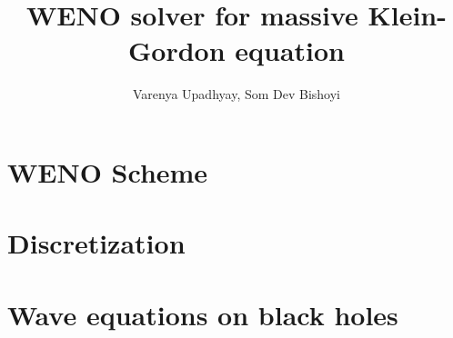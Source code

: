 \documentclass{article}[14pt]
\author{Varenya Upadhyay, Som Dev Bishoyi}
\title{WENO solver for massive Klein-Gordon equation}
\begin{document}
\maketitle
\section{WENO Scheme}
\section{Discretization}
\section{Wave equations on black holes}
\appendix
\end{document}
